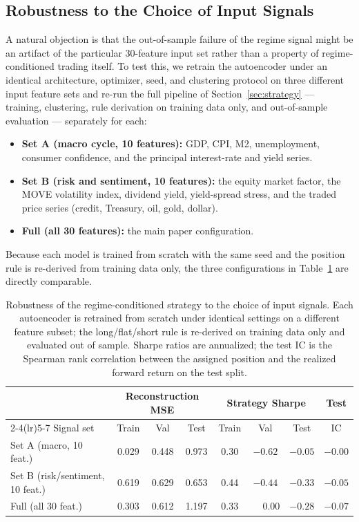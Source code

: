 \documentclass[conference]{IEEEtran}
\begin{document}
\subsection{Robustness to the Choice of Input Signals}
\label{sec:signals}

A natural objection is that the out-of-sample failure of the regime signal might
be an artifact of the particular 30-feature input set rather than a property of
regime-conditioned trading itself. To test this, we retrain the autoencoder under
an identical architecture, optimizer, seed, and clustering protocol on three
different input feature sets and re-run the full pipeline of
Section~\ref{sec:strategy} --- training, clustering, rule derivation on training
data only, and out-of-sample evaluation --- separately for each:
\begin{itemize}
  \item \textbf{Set A (macro cycle, 10 features):} GDP, CPI, M2, unemployment,
        consumer confidence, and the principal interest-rate and yield series.
  \item \textbf{Set B (risk and sentiment, 10 features):} the equity market
        factor, the MOVE volatility index, dividend yield, yield-spread stress,
        and the traded price series (credit, Treasury, oil, gold, dollar).
  \item \textbf{Full (all 30 features):} the main paper configuration.
\end{itemize}
Because each model is trained from scratch with the same seed and the position
rule is re-derived from training data only, the three configurations in
Table~\ref{tab:signals} are directly comparable.

\begin{table}[t]
\centering
\caption{Robustness of the regime-conditioned strategy to the choice of input
signals. Each autoencoder is retrained from scratch under identical settings on
a different feature subset; the long/flat/short rule is re-derived on training
data only and evaluated out of sample. Sharpe ratios are annualized; the test IC
is the Spearman rank correlation between the assigned position and the realized
forward return on the test split.}
\label{tab:signals}
\begin{tabular}{lccccccc}
\toprule
 & \multicolumn{3}{c}{Reconstruction MSE} & \multicolumn{3}{c}{Strategy Sharpe} & Test \\
\cmidrule(lr){2-4}\cmidrule(lr){5-7}
Signal set & Train & Val & Test & Train & Val & Test & IC \\
\midrule
Set A (macro, 10 feat.)          & 0.029 & 0.448 & 0.973 & 0.30 & $-0.62$           & $-0.05$ & $-0.00$ \\
Set B (risk/sentiment, 10 feat.) & 0.619 & 0.629 & 0.653 & 0.44 & $-0.44$           & $-0.33$ & $-0.05$ \\
Full (all 30 feat.)              & 0.303 & 0.612 & 1.197 & 0.33 & $\phantom{-}0.00$ & $-0.28$ & $-0.07$ \\
\bottomrule
\end{tabular}
\end{table}
\end{document}

